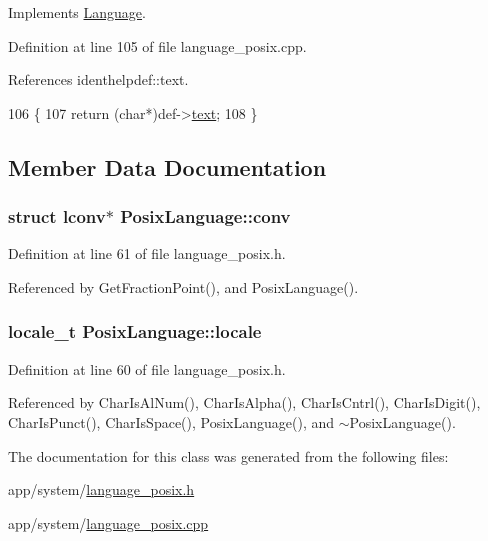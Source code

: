 Implements \hyperlink{classLanguage_a232a8b51c7866013363b9916fe89299c}{Language}.



Definition at line 105 of file language\+\_\+posix.\+cpp.



References identhelpdef\+::text.


\begin{DoxyCode}
106 \{
107     \textcolor{keywordflow}{return} (\textcolor{keywordtype}{char}*)def->\hyperlink{structidenthelpdef_ad2ce2c9f74dd7949618568812da41142}{text};
108 \}
\end{DoxyCode}


\subsection{Member Data Documentation}
\subsubsection[{\texorpdfstring{conv}{conv}}]{\setlength{\rightskip}{0pt plus 5cm}struct lconv$\ast$ Posix\+Language\+::conv\hspace{0.3cm}{\ttfamily [private]}}\hypertarget{classPosixLanguage_ae3f849883e2e59c9beb832e0f8d32db9}{}\label{classPosixLanguage_ae3f849883e2e59c9beb832e0f8d32db9}


Definition at line 61 of file language\+\_\+posix.\+h.



Referenced by Get\+Fraction\+Point(), and Posix\+Language().

\subsubsection[{\texorpdfstring{locale}{locale}}]{\setlength{\rightskip}{0pt plus 5cm}locale\+\_\+t Posix\+Language\+::locale\hspace{0.3cm}{\ttfamily [private]}}\hypertarget{classPosixLanguage_a51670668b4a1958b8974522daae6b4fa}{}\label{classPosixLanguage_a51670668b4a1958b8974522daae6b4fa}


Definition at line 60 of file language\+\_\+posix.\+h.



Referenced by Char\+Is\+Al\+Num(), Char\+Is\+Alpha(), Char\+Is\+Cntrl(), Char\+Is\+Digit(), Char\+Is\+Punct(), Char\+Is\+Space(), Posix\+Language(), and $\sim$\+Posix\+Language().



The documentation for this class was generated from the following files\+:\begin{DoxyCompactItemize}
\item 
app/system/\hyperlink{language__posix_8h}{language\+\_\+posix.\+h}\item 
app/system/\hyperlink{language__posix_8cpp}{language\+\_\+posix.\+cpp}\end{DoxyCompactItemize}
